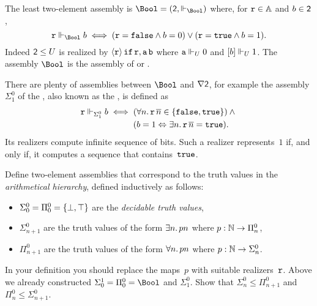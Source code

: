 The least two-element assembly is $\Bool = (\two, {\rz[\Bool]})$ where, for $\R{r} \in \AA$ and $b \in \two$,
%
\begin{equation*}
  \R{r} \rz[\Bool] b
  \iff
  (\R{r} = \combFalse \land b = 0) \lor
  (\R{r} = \combTrue \land b = 1).
\end{equation*}
%
Indeed $\two \leq U$ is realized by $\pcalam{\R{r}} \combIf\,\R{r},\R{a}\,\R{b}$ where $\R{a} \rz[U] 0$ and $\R[b] \rz[U] 1$.
%
The assembly $\Bool$ is the assembly of  or .

There are plenty of assemblies between $\Bool$ and $\nabla \two$, for example the assembly $\Sigma^0_1$ of the , also known as the , is defined as
%
\begin{equation*}
  \R{r} \rz[\Sigma^0_1] b
  \iff
  \begin{aligned}[t]
  & (\all{n} \R{r}\,\overline{n} \in \set{\combFalse, \combTrue})
  \land {} \\
  & (b = 1 \liff \some{n} \R{r}\,\overline{n} = \combTrue).
  \end{aligned}
\end{equation*}
%
Its realizers compute infinite sequence of bits. Such a realizer represents~$1$ if, and only if, it computes a sequence that contains~$\combTrue$.

\begin{exercise}
  Define two-element assemblies that correspond to the truth values in the \emph{arithmetical hierarchy}, defined inductively as follows:
  \begin{itemize}
  \item $\Sigma^0_0 = \Pi^0_0 = \set{\bot, \top}$ are the \emph{decidable truth values},
  \item $\Sigma^0_{n+1}$ are the truth values of the form $\some{n} p n$ where $p : \NN \to \Pi^0_n$,
  \item $\Pi^0_{n+1}$ are the truth values of the form $\all{n} p n$ where $p : \NN \to \Sigma^0_n$.
  \end{itemize}
  In your definition you should replace the maps~$p$ with suitable realizers~$\R{r}$.
  Above we already constructed $\Sigma_0^1 = \Pi^0_0 = \Bool$ and $\Sigma^0_1$. Show that $\Sigma^0_n \leq \Pi^0_{n+1}$ and $\Pi^0_n \leq \Sigma^0_{n+1}$.
\end{exercise}


